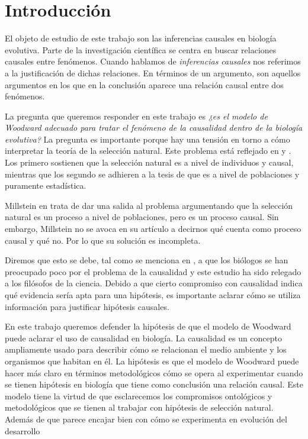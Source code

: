 
\chapter*{Introducción}


\noindent El objeto de estudio de este trabajo son las inferencias causales en biología evolutiva. Parte de la investigación científica se centra en buscar relaciones causales entre fenómenos. Cuando hablamos de \textit{inferencias causales} nos referimos a la justificación de dichas relaciones. En términos de un argumento, son aquellos argumentos en los que en la conclusión aparece una relación causal entre dos fenómenos.

La pregunta que queremos responder en este trabajo es \textit{¿es el modelo de Woodward adecuado para tratar el fenómeno de la causalidad dentro de la biología evolutiva?} La pregunta es importante porque hay una tensión en torno a cómo interpretar la teoría de la selección natural. Este problema está reflejado en \cite{Bouchard2004} y \cite{Walsh2002}. Los primero sostienen que la selección natural es a nivel de individuos y causal, mientras que los segundo se adhieren a la tesis de que es a nivel de poblaciones y puramente estadística.

Millstein en \cite{Millstein2006} trata de dar una salida al problema argumentando que la selección natural es un proceso a nivel de poblaciones, pero es un proceso causal. Sin embargo, Millstein no se avoca en su artículo a decirnos qué cuenta como proceso causal y qué no. Por lo que su solución es incompleta.

Diremos que esto se debe, tal como se menciona en \cite{Uller}, a que los biólogos se han preocupado poco por el problema de la causalidad y este estudio ha sido relegado a los filósofos de la ciencia. Debido a que cierto compromiso con causalidad indica qué evidencia sería apta para una hipótesis, es importante aclarar cómo se utiliza información para justificar hipótesis causales.

En este trabajo queremos defender la hipótesis de que el modelo de Woodward \cite{Woodward2000-WOOEAI} puede aclarar el uso de causalidad en biología. La causalidad es un concepto ampliamente usado para describir cómo se relacionan el medio ambiente y los organismos que habitan en él. La hipótesis es que el modelo de Woodward puede hacer más claro en términos metodológicos cómo se opera al experimentar cuando se tienen hipótesis en biología que tiene como conclusión una relación causal. Este modelo tiene la virtud de que esclarecemos los compromisos ontológicos y metodológicos que se tienen al trabajar con hipótesis de selección natural. Además de que parece encajar bien con cómo se experimenta en evolución del desarrollo \cite{Brakefield2014}

